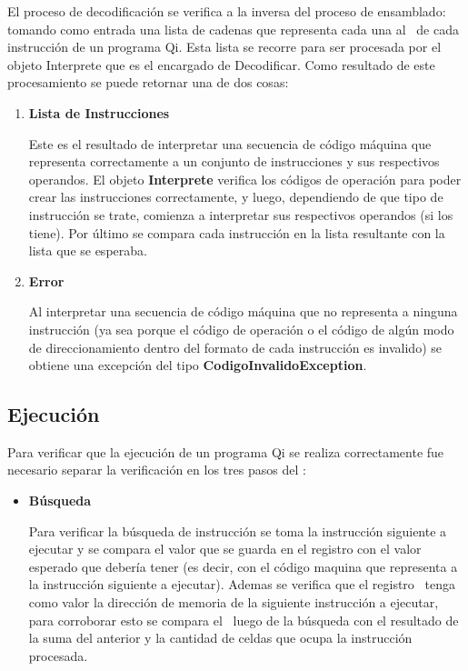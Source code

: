 \begin{enumerate}
El proceso de decodificación se verifica a la inversa del proceso de ensamblado: tomando como entrada una lista de cadenas que representa cada una al \codmaq\ de cada instrucción de un programa Qi. Esta lista se recorre para ser procesada por el objeto Interprete que es el encargado de Decodificar. Como resultado de este procesamiento se puede retornar una de dos cosas:
 
\begin{enumerate}
\item \textbf{Lista de Instrucciones} 

Este es el resultado de interpretar una secuencia de código máquina que representa correctamente a un conjunto de instrucciones y sus respectivos operandos. El objeto \textbf{Interprete} verifica los códigos de operación para poder crear las instrucciones correctamente, y luego, dependiendo de que tipo de instrucción se trate, comienza a interpretar sus respectivos operandos (si los tiene).
Por último se compara cada instrucción en la lista resultante con la lista que se esperaba.

\item\textbf{Error}

Al interpretar una secuencia de código máquina que no representa a ninguna instrucción (ya sea porque el código de operación o el código de algún modo de direccionamiento dentro del formato de cada instrucción es invalido) se obtiene una excepción del tipo \textbf{CodigoInvalidoException}.   
\end{enumerate}

\subsection{Ejecución}

Para verificar que la ejecución de un programa Qi se realiza correctamente fue necesario separar la verificación en los tres pasos del \ciclo:

\begin{itemize}
\item \textbf{Búsqueda} 

Para verificar la búsqueda de instrucción se toma la instrucción siguiente a ejecutar y se compara el valor que se guarda en el registro \IR con el valor esperado que debería tener (es decir, con el código maquina que representa a la instrucción siguiente a ejecutar). Ademas se verifica que el registro \PC\ tenga como valor la dirección de memoria de la siguiente instrucción a ejecutar, para corroborar esto se compara el \PC\ luego de la búsqueda con el resultado de la suma del \PC anterior y la cantidad de celdas que ocupa la instrucción procesada.


\end{itemize}
\end{enumerate}
